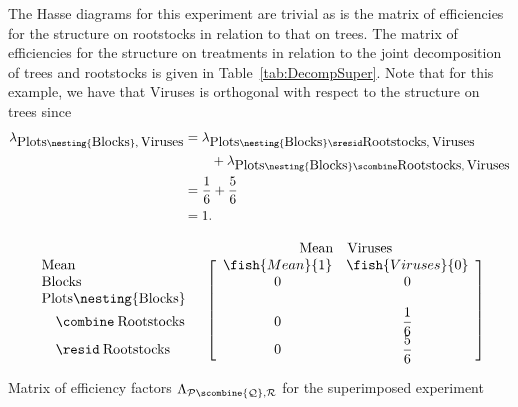 The Hasse diagrams for this experiment are trivial as is the matrix of 
efficiencies for the structure on rootstocks in relation to that on trees. 
The matrix of efficiencies for the structure on treatments in relation to 
the joint decomposition of trees and rootstocks is given in 
Table~\ref{tab:DecompSuper}. Note that for this example, we have that 
Viruses is orthogonal with respect to the 
structure on trees since
\begin{equation*}\begin{split}
\lambda_{\mbox{Plots} \nesting{\mbox{Blocks}},\:\mbox{Viruses}} 
  &= \lambda_{\mbox{Plots} \nesting{\mbox{Blocks}}
                            \sresid\mbox{Rootstocks},\:\mbox{Viruses}} \\
  & \qquad+ \lambda_{\mbox{Plots} \nesting{\mbox{Blocks}}
                           \scombine\mbox{Rootstocks},\:\mbox{Viruses}} \\
  & = \dfrac{1}{6} + \dfrac{5}{6} \\
  & = 1.
\end{split}\end{equation*}

\begin{table}[htbp]
\renewcommand{\arraystretch}{1.9}
\[
\begin{array}{cc}
&
\begin{array}{cc} 
\mbox{Mean} & \mbox{Viruses}
\end{array}
\\
\begin{array}{l}
\mbox{Mean}\\
\mbox{Blocks}\\
\mbox{Plots} \nesting{\mbox{Blocks}}\\
\quad\combine\:\mbox{Rootstocks} \vphantom{\dfrac{1}{6}}\\
\quad\resid\:\mbox{Rootstocks} \vphantom{\dfrac{5}{6}}\\
\end{array}
&
\left[
\begin{array}{cc}
 \fish{Mean}{1} & \fish{Viruses}{0} \\
 0 & 0\\
 \\
 0 & \dfrac{1}{6}\\
 0 & \dfrac{5}{6}\\
\end{array}
\right]
\end{array}
\]
\caption{Matrix of efficiency factors 
   $\Lambda_{{\cal P} \protect\scombine {\cal Q}, {\cal R}}$ 
   for the superimposed experiment}
\label{tab:DecompSuper}
\end{table}

